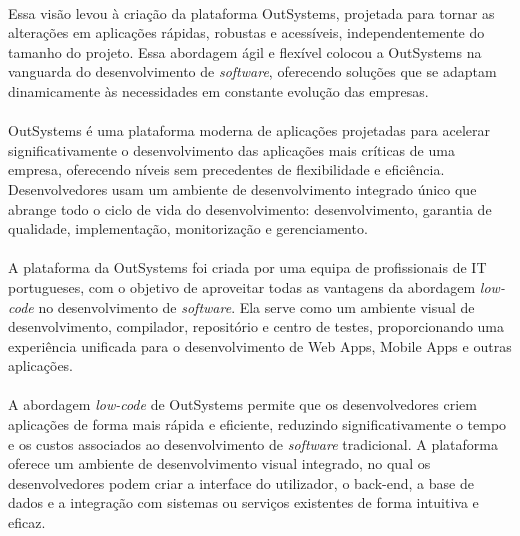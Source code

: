 \documentclass[pdflatex,sn-mathphys-num]{sn-jnl}
\theoremstyle{thmstyleone}
\theoremstyle{thmstyletwo}
\theoremstyle{thmstylethree}
\begin{document}
\paragraph{}Essa visão levou à criação da plataforma OutSystems, projetada para tornar as alterações em aplicações rápidas, robustas e acessíveis, independentemente do tamanho do projeto. Essa abordagem ágil e flexível colocou a OutSystems na vanguarda do desenvolvimento de \textit{software}, oferecendo soluções que se adaptam dinamicamente às necessidades em constante evolução das empresas.\cite{bib9}

\paragraph{}OutSystems é uma plataforma moderna de aplicações projetadas para acelerar significativamente o desenvolvimento das aplicações mais críticas de uma empresa, oferecendo níveis sem precedentes de flexibilidade e eficiência. Desenvolvedores usam um ambiente de desenvolvimento integrado único que abrange todo o ciclo de vida do desenvolvimento: desenvolvimento, garantia de qualidade, implementação, monitorização e gerenciamento.\cite{bib11}

\paragraph{}A plataforma da OutSystems foi criada por uma equipa de profissionais de IT portugueses, com o objetivo de aproveitar todas as vantagens da abordagem \textit{low-code} no desenvolvimento de \textit{software}. Ela serve como um ambiente visual de desenvolvimento, compilador, repositório e centro de testes, proporcionando uma experiência unificada para o desenvolvimento de Web Apps, Mobile Apps e outras aplicações.\cite{bib11}

\paragraph{}A abordagem \textit{low-code} de OutSystems permite que os desenvolvedores criem aplicações de forma mais rápida e eficiente, reduzindo significativamente o tempo e os custos associados ao desenvolvimento de \textit{software} tradicional. A plataforma oferece um ambiente de desenvolvimento visual integrado, no qual os desenvolvedores podem criar a interface do utilizador, o back-end, a base de dados e a integração com sistemas ou serviços existentes de forma intuitiva e eficaz.\cite{bib11}
\end{document}
